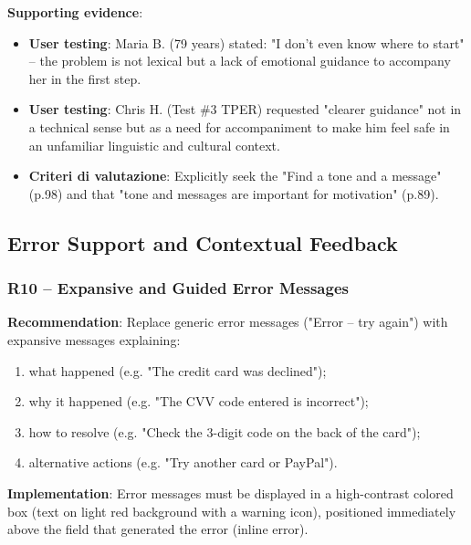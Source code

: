﻿\documentclass[11pt,a4paper]{article}
\begin{document}
\textbf{Supporting evidence}:
\begin{itemize}
    \item \textbf{User testing}: Maria B. (79 years) stated: "I don't even know
    where to start" -- the problem is not lexical but a
    lack of emotional guidance to accompany her in the first step.
    \item \textbf{User testing}: Chris H. (Test \#3 TPER) requested
    "clearer guidance" not in a technical sense but as a need for
    accompaniment to make him feel safe in an unfamiliar
    linguistic and cultural context.
    \item \textbf{Criteri di valutazione}: Explicitly seek
    the "Find a tone and a message" (p.98) and that
    "tone and messages are important for motivation" (p.89).
\end{itemize}



\subsection{Error Support and Contextual Feedback}

\subsubsection{R10 -- Expansive and Guided Error Messages}
\label{rec:R10}

\textbf{Recommendation}: Replace generic error messages
("Error -- try again") with expansive messages explaining:
\begin{enumerate}
    \item what happened (e.g. "The credit card was declined");
    \item why it happened (e.g. "The CVV code entered is incorrect");
    \item how to resolve (e.g. "Check the 3-digit code on the back of the
    card");
    \item alternative actions (e.g. "Try another card or PayPal").
\end{enumerate}

\textbf{Implementation}: Error messages must be displayed in
a high-contrast colored box (text on light red background with a warning
icon), positioned immediately above the field that generated
the error (inline error).
\end{document}
